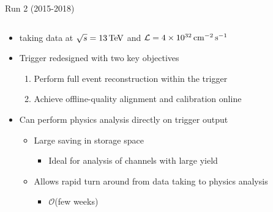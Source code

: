 \documentclass[aspectratio=1610]{beamer}
\DeclareRobustCommand{\orderof}{\ensuremath{\mathcal{O}}}
\begin{document}
\begin{frame}{\lhcb Run 2 (2015-2018)}

\begin{columns}
\begin{column}{0.7\textwidth}
\begin{itemize}
  \item \lhcb taking data at $\protect\sqrt{s}=13\mathrm{\,Te\kern -0.1em V}$ and $\mathcal{L}=4\times10^{32}\mathrm{ \,cm}^{-2}\mathrm{{\,s}}^{-1}$
\end{itemize}

\begin{itemize}
  \item Trigger redesigned with two key objectives
  \begin{enumerate}
      \item Perform full event reconstruction within the trigger
      \item Achieve offline-quality alignment and calibration online
    \end{enumerate}
\end{itemize}

\begin{itemize}
  \item Can perform physics analysis directly on trigger output
  \begin{itemize}
      \item[\ding{70}] Large saving in storage space
      \begin{itemize}
        \item Ideal for analysis of channels with large yield 
      \end{itemize}
      \item[\ding{70}] Allows rapid turn around from data taking to physics analysis
      \begin{itemize}
        \item \orderof(few weeks)
      \end{itemize}
    \end{itemize}
\end{itemize}


\end{column}
\end{columns}
\end{frame}
\end{document}
